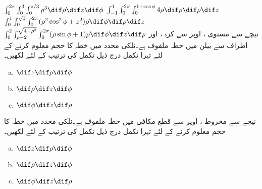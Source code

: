 $\int_{0}^{2\pi}\int_{0}^{3}\int_{0}^{z/3} \rho^3\dif\rho \dif z\dif \phi$
$\int_{-1}^{1}\int_{0}^{2\pi}\int_{0}^{1+\cos\phi} 4\rho\dif\rho \dif \rho\dif z$
$\int_{0}^{1}\int_{0}^{\sqrt{z}}\int_{0}^{2\pi}(\rho^2\cos^2\phi+z^2)\rho \dif\phi\dif\rho \dif z$
$\int_{0}^{2}\int_{\rho-2}^{\sqrt{4-\rho^2}}\int_{0}^{2\pi} (\rho\sin\phi+1)\rho \dif \phi \dif z\dif \rho$
نیچے سے مستوی ، اوپر سے کرہ ، اور اطراف سے بیلن  میں  خطہ   ملفوف ہے۔نلکی محدد میں  خطہ  کا حجم معلوم کرنے کے لئے تہرا تکمل درج ذیل  تکمل کی ترتیب کے لئے لکھیں۔
\begin{multicols}{3}
\begin{enumerate}[a.]
\item
$\dif z\dif \rho\dif\phi$
\item
$\dif \rho\dif z\dif\phi$
\item
$\dif \phi\dif z\dif\rho$
\end{enumerate}
\end{multicols}
نیچے سے مخروط  ، اوپر سے قطع مکافی    میں  خطہ   ملفوف ہے۔نلکی محدد میں  خطہ  کا حجم معلوم کرنے کے لئے تہرا تکمل درج ذیل  تکمل کی ترتیب کے لئے لکھیں۔
\begin{multicols}{3}
\begin{enumerate}[a.]
\item
$\dif z\dif \rho\dif\phi$
\item
$\dif \rho\dif z\dif\phi$
\item
$\dif \phi\dif z\dif\rho$
\end{enumerate}
\end{multicols}
